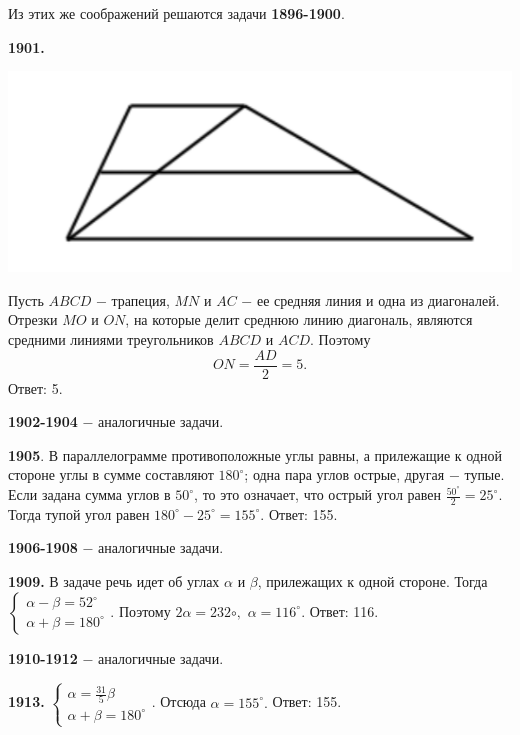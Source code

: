 Из этих же соображений решаются задачи \textbf{1896-1900}.

\textbf{1901.}

{\centering \includegraphics[width=0.5\linewidth]{Geometry/Content/25.png}
	
}

Пусть $ABCD$ $-$ трапеция, $MN$ и $AC$ $-$ ее средняя линия и одна из диагоналей. Отрезки $MO$ и $ON$, на которые делит среднюю линию диагональ, являются средними линиями треугольников $ABCD$ и $ACD$. Поэтому
\[
ON = \frac{AD}{2} = 5.
\] \null \hspace*{\fill} Ответ: 5.

\textbf{1902-1904} $-$ аналогичные задачи.

\textbf{1905}. В параллелограмме противоположные углы равны, а прилежащие к одной стороне углы в сумме составляют $180^\circ$; одна пара углов острые, другая $-$ тупые. Если задана сумма углов в $50^\circ$, то это означает, что острый угол равен $\frac{50^\circ}{2} = 25^\circ$. Тогда тупой угол равен $180^\circ - 25^\circ = 155^\circ.$ \newline \null \hspace*{\fill} Ответ: 155.

\textbf{1906-1908} $-$ аналогичные задачи.

\clearpage

\textbf{1909.} В задаче речь идет об углах $\alpha$ и $\beta$, прилежащих к одной стороне. Тогда   $\begin{cases} \alpha - \beta = 52^\circ \\ \alpha + \beta = 180^\circ \end{cases}$. Поэтому $2\alpha = 232\circ,$ $\alpha = 116^\circ.$ \newline \null \hspace*{\fill} Ответ: 116.

\textbf{1910-1912} $-$ аналогичные задачи.

\textbf{1913.} $\begin{cases} \alpha = \frac{31}{5}\beta \\ \alpha + \beta = 180^\circ \end{cases}$. Отсюда $\alpha = 155^\circ.$ \newline \null \hspace*{\fill} Ответ: 155.

